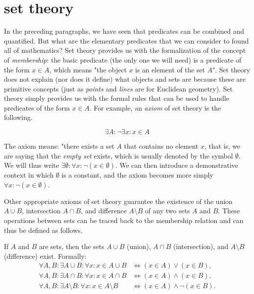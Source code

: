 \section{set theory}

In the preceding paragraphs, we have seen that predicates can be combined and
quantified. But what are the elementary predicates that we can consider to found
all of mathematics? Set theory provides us with the formalization of the concept
of \emph{membership}: the basic predicate (the only one we will need) is a
predicate of the form $x \in A$, which means "the object $x$ is an element of
the set $A$". Set theory does not explain (nor does it define) what objects and
sets are because these are primitive concepts (just as \emph{points} and
\emph{lines} are for Euclidean geometry). Set theory simply provides us with the
formal rules that can be used to handle predicates of the form $x\in A$. For
example, an \emph{axiom} of set theory is the following.

\begin{axiom}
\[
  \exists A \colon \lnot \exists x\colon x \in A
\]
\end{axiom}

The axiom means: "there exists a set $A$ that contains no element $x$, that is,
we are saying that the \emph{empty set}%
%
 exists, which is usually denoted by the symbol $\emptyset$. We will thus write $\exists\emptyset\colon \forall x\colon \lnot(x\in \emptyset)$. We can then introduce a demonstrative context in which $\emptyset$ is a constant, and the axiom becomes more simply $\forall x\colon \lnot (x\in \emptyset)$.

Other appropriate axioms of set theory guarantee the existence of the union
$A\cup B$, intersection $A\cap B$, and difference $A\setminus B$ of any two sets
$A$ and $B$. These operations between sets can be traced back to the membership
relation and can thus be defined as follows.

\begin{axiom}
If $A$ and $B$ are sets, then the sets $A\cup B$ (union), $A\cap B$
(intersection), and $A\setminus B$ (difference) exist.
%
%
%
%
Formally:
\begin{align*}
    \forall A,B\colon \exists A\cup B \colon \forall x\colon x\in A\cup B &\iff (x\in A) \lor (x\in B),\\
    \forall A,B\colon \exists A\cap B \colon \forall x\colon x\in A\cap B &\iff (x\in A) \land (x\in B),\\
    \forall A,B\colon \exists A\setminus B \colon \forall x\colon x\in A\setminus B &\iff (x\in A) \land \lnot (x \in B).
\end{align*}
\end{axiom}

